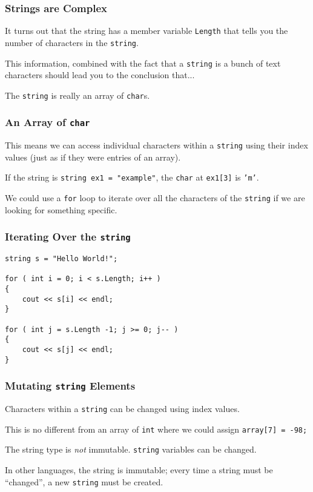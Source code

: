 \begin{frame}
\frametitle{Strings are Complex}

It turns out that the string has a member variable \texttt{Length} that tells you the number of characters in the \texttt{string}.

This information, combined with the fact that a \texttt{string} is a bunch of text characters should lead you to the conclusion that...

The \texttt{string} is really an \alert{array of \texttt{char}s}.

\end{frame}

\begin{frame}
\frametitle{An Array of \texttt{char}}

This means we can access individual characters within a \texttt{string} using their index values (just as if they were entries of an array).

If the string is \texttt{string ex1 = "example"}, the \texttt{char} at \texttt{ex1[3]} is \texttt{'m'}.

We could use a \texttt{for} loop to iterate over all the characters of the \texttt{string} if we are looking for something specific.

\end{frame}

\begin{frame}[fragile]
\frametitle{Iterating Over the \texttt{string}}

\begin{verbatim}
string s = "Hello World!";

for ( int i = 0; i < s.Length; i++ )
{
    cout << s[i] << endl;
}

for ( int j = s.Length -1; j >= 0; j-- )
{
    cout << s[j] << endl;
}
\end{verbatim}

\end{frame}

\begin{frame}
\frametitle{Mutating \texttt{string} Elements}

Characters within a \texttt{string} can be changed using index values.

This is no different from an array of \texttt{int} where we could assign \texttt{array[7] = -98;}

The string type is \textit{not} \alert{immutable}. \texttt{string} variables can be changed.


In other languages, the string is immutable; every time a string must be ``changed'', a new \texttt{string} must be created.

\end{frame}



